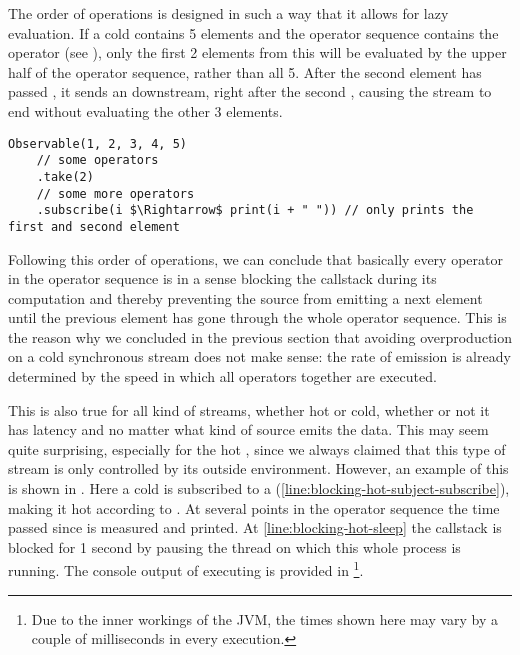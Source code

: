 The order of operations is designed in such a way that it allows for lazy evaluation. If a cold \obs contains 5 elements and the operator sequence contains the operator  (see ), only the first 2 elements from this \obs will be evaluated by the upper half of the operator sequence, rather than all 5. After the second element has passed , it sends an  downstream, right after the second , causing the stream to end without evaluating the other 3 elements.

\begin{minipage}{\linewidth}
\begin{lstlisting}[style=ScalaStyle, caption={Lazy evaluation}, label={lst:lazy}]
Observable(1, 2, 3, 4, 5)
    // some operators
    .take(2)
    // some more operators
    .subscribe(i $\Rightarrow$ print(i + " ")) // only prints the first and second element
\end{lstlisting}
\end{minipage}

Following this order of operations, we can conclude that basically every operator in the operator sequence is in a sense blocking the callstack during its computation and thereby preventing the source from emitting a next element until the previous element has gone through the whole operator sequence. This is the reason why we concluded in the previous section that avoiding overproduction on a cold synchronous stream does not make sense: the rate of emission is already determined by the speed in which all operators together are executed.

This is also true for all kind of streams, whether hot or cold, whether or not it has latency and no matter what kind of source emits the data. This may seem quite surprising, especially for the hot \obs, since we always claimed that this type of stream is only controlled by its outside environment. However, an example of this is shown in . Here a cold \obs is subscribed to a \subj (\cref{line:blocking-hot-subject-subscribe}), making it hot according to . At several points in the operator sequence the time passed since  is measured and printed. At \cref{line:blocking-hot-sleep} the callstack is blocked for 1 second by pausing the thread on which this whole process is running. The console output of executing  is provided in \footnote{Due to the inner workings of the JVM, the times shown here may vary by a couple of milliseconds in every execution.}.

